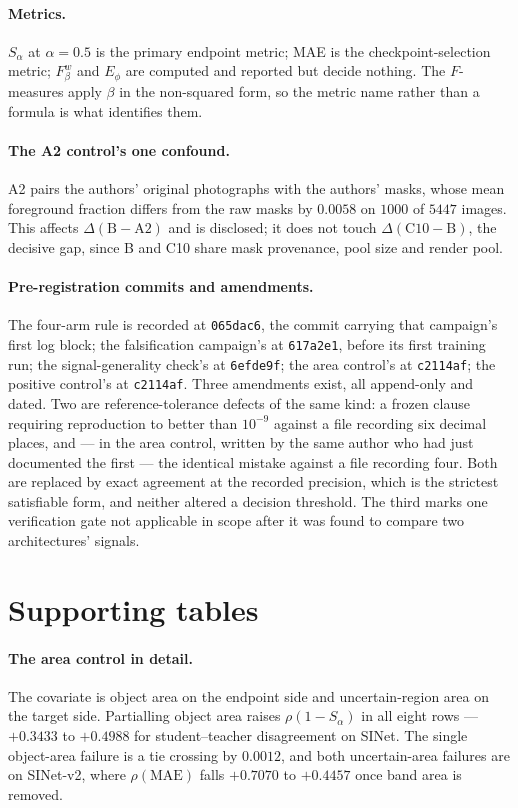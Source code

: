 \documentclass{article} %
\begin{document}
\paragraph{Metrics.} $S_\alpha$ at $\alpha = 0.5$ is the primary endpoint metric; MAE is the
checkpoint-selection metric; $F_\beta^w$ and $E_\phi$ are computed and reported but decide nothing.
The $F$-measures apply $\beta$ in the non-squared form, so the metric name rather than a formula is
what identifies them.

\paragraph{The A2 control's one confound.} A2 pairs the authors' original photographs with the
authors' masks, whose mean foreground fraction differs from the raw masks by $0.0058$ on $1000$ of
$5447$ images. This affects $\Delta(\mathrm{B}-\mathrm{A2})$ and is disclosed; it does not touch
$\Delta(\mathrm{C10}-\mathrm{B})$, the decisive gap, since B and C10 share mask provenance, pool size
and render pool.

\paragraph{Pre-registration commits and amendments.} The four-arm rule is recorded at
\texttt{065dac6}, the commit carrying that campaign's first log block; the falsification campaign's at
\texttt{617a2e1}, before its first training run; the signal-generality check's at \texttt{6efde9f};
the area control's at \texttt{c2114af}; the positive control's at \texttt{c2114af}. Three amendments
exist, all append-only and dated. Two are reference-tolerance defects of the same kind: a frozen clause
requiring reproduction to better than $10^{-9}$ against a file recording six decimal places, and --- in
the area control, written by the same author who had just documented the first --- the identical
mistake against a file recording four. Both are replaced by exact agreement at the recorded precision,
which is the strictest satisfiable form, and neither altered a decision threshold. The third marks one
verification gate not applicable in scope after it was found to compare two architectures' signals.

\section{Supporting tables}
\label{app:tables}

\paragraph{The area control in detail.} The covariate is object area on the endpoint side and
uncertain-region area on the target side. Partialling object area raises $\rho(1-S_\alpha)$ in all
eight rows --- $+0.3433$ to $+0.4988$ for student--teacher disagreement on SINet. The single
object-area failure is a tie crossing by $0.0012$, and both uncertain-area failures are on SINet-v2,
where $\rho(\mathrm{MAE})$ falls $+0.7070$ to $+0.4457$ once band area is removed.
\end{document}
